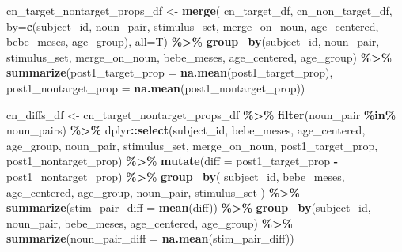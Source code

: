 \documentclass[
  doc,floatsintext]{apa6}
\newenvironment{Shaded}{\begin{snugshade}}{\end{snugshade}}
\newcommand{\AttributeTok}[1]{\textcolor[rgb]{0.13,0.29,0.53}{#1}}
\newcommand{\FunctionTok}[1]{\textcolor[rgb]{0.13,0.29,0.53}{\textbf{#1}}}
\newcommand{\NormalTok}[1]{#1}
\newcommand{\OtherTok}[1]{\textcolor[rgb]{0.56,0.35,0.01}{#1}}
\newcommand{\SpecialCharTok}[1]{\textcolor[rgb]{0.81,0.36,0.00}{\textbf{#1}}}
\newcommand{\StringTok}[1]{\textcolor[rgb]{0.31,0.60,0.02}{#1}}
\begin{document}
\begin{Shaded}
\begin{Highlighting}[]
\NormalTok{cn\_target\_nontarget\_props\_df }\OtherTok{\textless{}{-}} \FunctionTok{merge}\NormalTok{(}
\NormalTok{  cn\_target\_df, cn\_non\_target\_df, }
                                      \AttributeTok{by=}\FunctionTok{c}\NormalTok{(}\StringTok{\textquotesingle{}subject\_id\textquotesingle{}}\NormalTok{, }
                                           \StringTok{\textquotesingle{}noun\_pair\textquotesingle{}}\NormalTok{,}
                                           \StringTok{\textquotesingle{}stimulus\_set\textquotesingle{}}\NormalTok{,}
                                           \StringTok{\textquotesingle{}merge\_on\_noun\textquotesingle{}}\NormalTok{,}
                                           \StringTok{\textquotesingle{}age\_centered\textquotesingle{}}\NormalTok{,}
                                           \StringTok{\textquotesingle{}bebe\_meses\textquotesingle{}}\NormalTok{,}
                                           \StringTok{\textquotesingle{}age\_group\textquotesingle{}}\NormalTok{),}
  \AttributeTok{all=}\NormalTok{T) }\SpecialCharTok{\%\textgreater{}\%}
  \FunctionTok{group\_by}\NormalTok{(subject\_id, noun\_pair, stimulus\_set, merge\_on\_noun, }
\NormalTok{           bebe\_meses, age\_centered, age\_group) }\SpecialCharTok{\%\textgreater{}\%}
  \FunctionTok{summarize}\NormalTok{(}\AttributeTok{post1\_target\_prop =} \FunctionTok{na.mean}\NormalTok{(post1\_target\_prop),}
            \AttributeTok{post1\_nontarget\_prop =} \FunctionTok{na.mean}\NormalTok{(post1\_nontarget\_prop))}
  
\NormalTok{cn\_diffs\_df }\OtherTok{\textless{}{-}}\NormalTok{  cn\_target\_nontarget\_props\_df }\SpecialCharTok{\%\textgreater{}\%}
  \FunctionTok{filter}\NormalTok{(noun\_pair }\SpecialCharTok{\%in\%}\NormalTok{ noun\_pairs) }\SpecialCharTok{\%\textgreater{}\%}
\NormalTok{  dplyr}\SpecialCharTok{::}\FunctionTok{select}\NormalTok{(subject\_id, }
\NormalTok{                bebe\_meses, age\_centered, age\_group,}
\NormalTok{                noun\_pair, }
\NormalTok{                stimulus\_set, merge\_on\_noun, }
\NormalTok{                post1\_target\_prop,}
\NormalTok{                post1\_nontarget\_prop) }\SpecialCharTok{\%\textgreater{}\%}
  \FunctionTok{mutate}\NormalTok{(}\AttributeTok{diff =}\NormalTok{ post1\_target\_prop }\SpecialCharTok{{-}}\NormalTok{ post1\_nontarget\_prop) }\SpecialCharTok{\%\textgreater{}\%}
  \FunctionTok{group\_by}\NormalTok{(}
\NormalTok{    subject\_id, bebe\_meses, age\_centered, age\_group,}
\NormalTok{    noun\_pair, stimulus\_set}
\NormalTok{    ) }\SpecialCharTok{\%\textgreater{}\%}
  \FunctionTok{summarize}\NormalTok{(}\AttributeTok{stim\_pair\_diff =} \FunctionTok{mean}\NormalTok{(diff)) }\SpecialCharTok{\%\textgreater{}\%}
  \FunctionTok{group\_by}\NormalTok{(subject\_id, noun\_pair, bebe\_meses, age\_centered, age\_group) }\SpecialCharTok{\%\textgreater{}\%}
  \FunctionTok{summarize}\NormalTok{(}\AttributeTok{noun\_pair\_diff =} \FunctionTok{na.mean}\NormalTok{(stim\_pair\_diff)) }


\end{Highlighting}
\end{Shaded}
\end{document}
